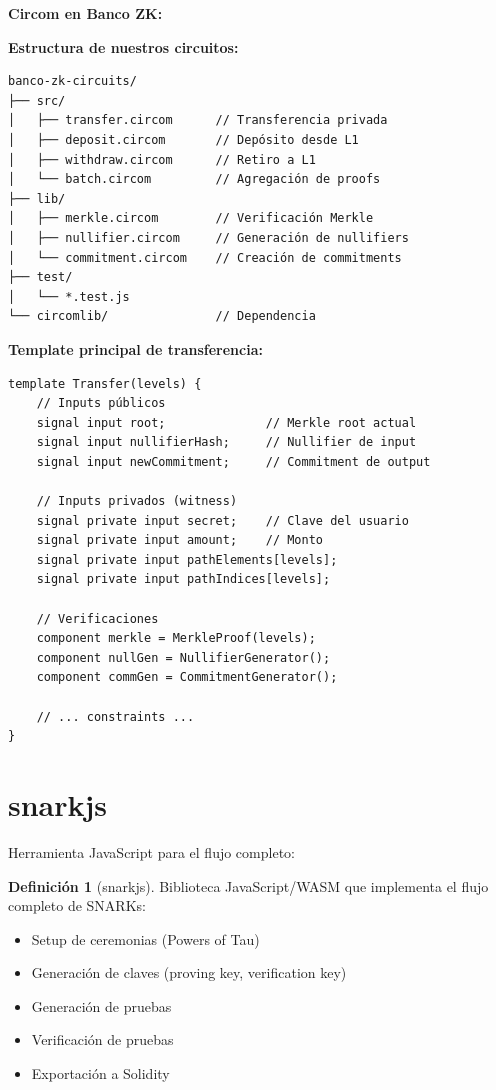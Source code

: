 \documentclass[11pt,a4paper,twoside,openright]{book}
\theoremstyle{definition}
\newtheorem{definition}{Definición}[chapter]
\theoremstyle{plain}
\theoremstyle{remark}
\begin{document}
\begin{bancozk}
\textbf{Circom en Banco ZK:}

\textbf{Estructura de nuestros circuitos:}

\begin{verbatim}
banco-zk-circuits/
├── src/
│   ├── transfer.circom      // Transferencia privada
│   ├── deposit.circom       // Depósito desde L1
│   ├── withdraw.circom      // Retiro a L1
│   └── batch.circom         // Agregación de proofs
├── lib/
│   ├── merkle.circom        // Verificación Merkle
│   ├── nullifier.circom     // Generación de nullifiers
│   └── commitment.circom    // Creación de commitments
├── test/
│   └── *.test.js
└── circomlib/               // Dependencia
\end{verbatim}

\textbf{Template principal de transferencia:}
\begin{verbatim}
template Transfer(levels) {
    // Inputs públicos
    signal input root;              // Merkle root actual
    signal input nullifierHash;     // Nullifier de input
    signal input newCommitment;     // Commitment de output
    
    // Inputs privados (witness)
    signal private input secret;    // Clave del usuario
    signal private input amount;    // Monto
    signal private input pathElements[levels];
    signal private input pathIndices[levels];
    
    // Verificaciones
    component merkle = MerkleProof(levels);
    component nullGen = NullifierGenerator();
    component commGen = CommitmentGenerator();
    
    // ... constraints ...
}
\end{verbatim}
\end{bancozk}


\section{snarkjs}

Herramienta JavaScript para el flujo completo:

\begin{definition}[snarkjs]
Biblioteca JavaScript/WASM que implementa el flujo completo de SNARKs:
\begin{itemize}
    \item Setup de ceremonias (Powers of Tau)
    \item Generación de claves (proving key, verification key)
    \item Generación de pruebas
    \item Verificación de pruebas
    \item Exportación a Solidity
\end{itemize}
\end{definition}
\end{document}
